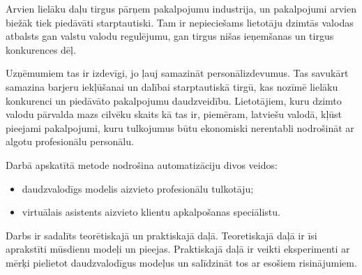 Arvien lielāku daļu tirgus pārņem pakalpojumu industrija,
un pakalpojumi arvien biežāk tiek piedāvāti starptautiski. Tam ir nepieciešams lietotāju dzimtās valodas atbalsts gan valstu valodu regulējumu, gan tirgus nišas ieņemšanas un tirgus konkurences dēļ.

Uzņēmumiem tas ir izdevīgi, jo ļauj samazināt personālizdevumus.
Tas savukārt samazina barjeru iekļūšanai un dalībai starptautiskā tirgū, kas nozīmē lielāku konkurenci un piedāvāto pakalpojumu daudzveidību. Lietotājiem, kuru dzimto valodu pārvalda mazs cilvēku skaits kā tas ir, piemēram, latviešu valodā, kļūst pieejami pakalpojumi, kuru tulkojumus būtu ekonomiski nerentabli nodrošināt ar algotu profesionālu personālu.

Darbā apskatītā metode nodrošina automatizāciju divos veidos: 
\begin{itemize}
	\item daudzvalodīgs modelis aizvieto profesionālu tulkotāju;
	\item virtuālais asistents aizvieto klientu apkalpošanas speciālistu.
\end{itemize}

Darbs ir sadalīts teorētiskajā un praktiskajā daļā. Teoretiskajā daļā ir īsi aprakstīti mūsdienu modeļi un pieejas. Praktiskajā daļā ir veikti eksperimenti ar mērķi pielietot daudzvalodīgus modeļus un salīdzināt tos ar esošiem risinājumiem. 